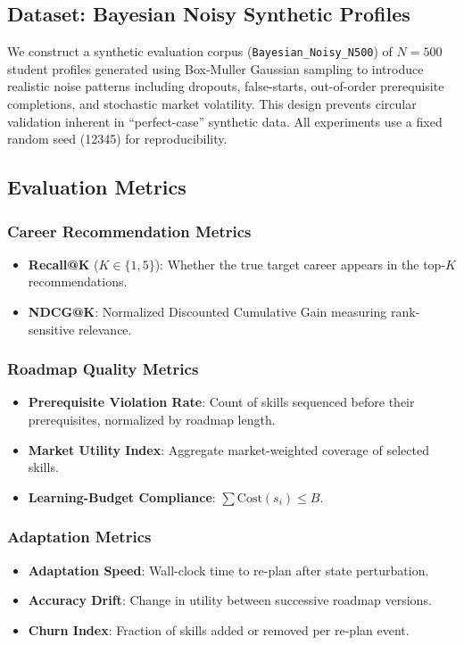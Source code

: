 \documentclass[conference]{IEEEtran}
\begin{document}
\subsection{Dataset: Bayesian Noisy Synthetic Profiles}

We construct a synthetic evaluation corpus (\texttt{Bayesian\_Noisy\_N500}) of $N{=}500$ student profiles generated using Box-Muller Gaussian sampling to introduce realistic noise patterns including dropouts, false-starts, out-of-order prerequisite completions, and stochastic market volatility. This design prevents circular validation inherent in ``perfect-case'' synthetic data. All experiments use a fixed random seed (12345) for reproducibility.

\subsection{Evaluation Metrics}

\subsubsection{Career Recommendation Metrics}
\begin{itemize}
    \item \textbf{Recall@K} ($K \in \{1, 5\}$): Whether the true target career appears in the top-$K$ recommendations.
    \item \textbf{NDCG@K}: Normalized Discounted Cumulative Gain measuring rank-sensitive relevance.
\end{itemize}

\subsubsection{Roadmap Quality Metrics}
\begin{itemize}
    \item \textbf{Prerequisite Violation Rate}: Count of skills sequenced before their prerequisites, normalized by roadmap length.
    \item \textbf{Market Utility Index}: Aggregate market-weighted coverage of selected skills.
    \item \textbf{Learning-Budget Compliance}: $\sum \text{Cost}(s_i) \leq B$.
\end{itemize}

\subsubsection{Adaptation Metrics}
\begin{itemize}
    \item \textbf{Adaptation Speed}: Wall-clock time to re-plan after state perturbation.
    \item \textbf{Accuracy Drift}: Change in utility between successive roadmap versions.
    \item \textbf{Churn Index}: Fraction of skills added or removed per re-plan event.
\end{itemize}
\end{document}
